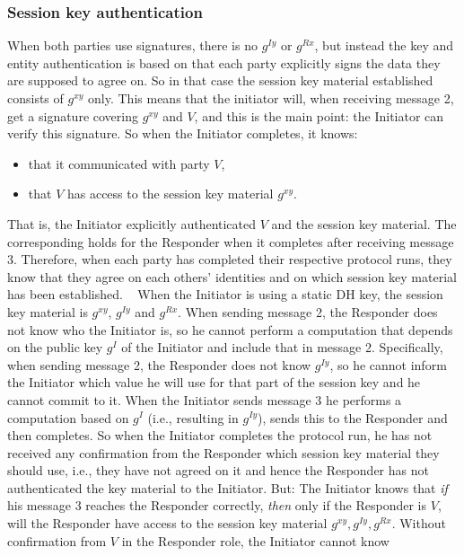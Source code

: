 \subsubsection{Session key authentication}
\label{sec:mail-notes-session-key-auth}
%
When both parties use signatures, there is no $g^{Iy}$ or $g^{Rx}$, but instead
the key and entity authentication is based on that each party explicitly signs
the data they are supposed to agree on.
%
So in that case the session key material established consists of $g^{xy}$
only.
% 
This means that the initiator will, when receiving message 2, get a signature
covering $g^{xy}$ and $V$, and this is the main point: the Initiator can
verify this signature.
%
So when the Initiator completes, it knows:
%
\begin{itemize}
    \item that it communicated with party $V$,
    \item that $V$ has access to the session key material $g^{xy}$.
\end{itemize}
%
That is, the Initiator explicitly authenticated $V$ and the session key
material.
%
The corresponding holds for the Responder when it completes after receiving
message 3.
%
Therefore, when each party has completed their respective protocol
runs, they know that they agree on each others' identities and on which session
key material has been established.
%
 
When the Initiator is using a static DH key, the session key material is
$g^{xy}$, $g^{Iy}$ and $g^{Rx}$.
%
When sending message 2, the Responder does not know who the Initiator is, so
he cannot perform a computation that depends on the public key $g^{I}$ of the
Initiator and include that in message 2.
%
Specifically, when sending message 2, the Responder does not know $g^{Iy}$, so
he cannot inform the Initiator which value he will use for that part of the
session key and he cannot commit to it.
%
When the Initiator sends message 3 he performs a computation based on $g^I$
(i.e., resulting in $g^{Iy}$), sends this to the Responder and then completes.
%
So when the Initiator completes the protocol run, he has not received any
confirmation from the Responder which session key material they should use,
i.e., they have not agreed on it and hence the Responder has not authenticated
the key material to the Initiator.
%
But: The Initiator knows that \emph{if} his message 3 reaches the Responder
correctly, \emph{then} only if the Responder is $V$, will the Responder have
access to the session key material $g^{xy}, g^{Iy}, g^{Rx}$.
%
Without confirmation from $V$ in the Responder role, the Initiator cannot know
